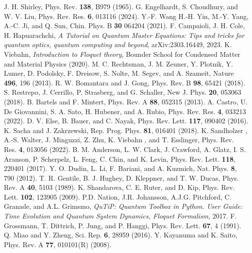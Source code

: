 \documentclass[reprint, amsmath, amssymb, aps]{revtex4-2}
\begin{document}
\begin{thebibliography}{9}
J. H. Shirley, Phys. Rev. \textbf{138}, B979 (1965). 
G. Engelhardt, S. Choudhury, and W. V. Liu, Phys. Rev. Res. \textbf{6}, 013116 (2024). 
Y.-F. Wang H.-H. Yin, M.-Y. Yang, A.-C. Ji, and Q. Sun, Chin. Phys. B \textbf{30} 064204 (2021).
F. Campaioli, J. H. Cole, H. Hapuarachchi, \textit{A Tutorial on Quantum Master Equations: Tips and tricks for quantum optics, quantum computing and beyond}, arXiv:2303.16449, 2023. 
K. Viebahn, \textit{Introduction to Floquet theory}, Bounder School for Condensed Matter and Material Physics (2020).
M. C. Rechtsman, J. M. Zeuner, Y. Plotnik, Y. Lumer, D. Podolsky, F. Dreisow, S. Nolte, M. Segev, and A. Szameit, Nature \textbf{496}, 196 (2013).
R. W. Bomantara and J. Gong, Phys. Rev. B \textbf{98}, 65421 (2018).
S. Restrepo, J. Cerrillo, P. Strasberg, and G. Schaller, New J. Phys. \textbf{20}, 053063 (2018).
B. Bartels and F. Mintert, Phys. Rev. A \textbf{88}, 052315 (2013).
A. Castro, U. De Giovannini, S. A. Sato, H. Hubener, and A. Rubio, Phys. Rev. Res. \textbf{4}, 033213 (2022).
D. V. Else, B. Bauer, and C. Nayak, Phys. Rev. Lett. \textbf{117}, 090402 (2016).
K. Sacha and J. Zakrzewski, Rep. Prog. Phys. \textbf{81}, 016401 (2018).
K. Sandholzer , A.-S. Walter, J. Minguzzi, Z. Zhu, K. Viebahn , and T. Esslinger, Phys. Rev. Res. \textbf{4}, 013056 (2022). 
B. M. Anderson, L. W. Clark, J. Crawford, A. Glatz, I. S. Aranson, P. Scherpelz, L. Feng, C. Chin, and K. Levin, Phys. Rev. Lett. \textbf{118}, 220401 (2017). 
Y. O. Dudin, L. Li, F. Bariani, and A. Kuzmich, Nat. Phys. \textbf{8}, 790 (2012).
T. R. Gentile, B. J. Hughey, D. Kleppner, and T. W. Ducas, Phys. Rev. A \textbf{40}, 5103 (1989). 
K. Shandarova, C. E. Ruter, and D. Kip, Phys. Rev. Lett. \textbf{102}, 123905 (2009).
P.D. Nation, J.R. Johansson, A.J.G. Pitchford, C. Granade, and A.L. Grimsmo, \textit{QuTiP: Quantum Toolbox in Python. User Guide: Time Evolution and Quantum System Dynamics, Floquet Formalism}, 2017. 
F. Grossmann, T. Dittrich, P. Jung, and P. Hanggi, Phys. Rev. Lett. \textbf{67}, 4 (1991).
Q. Miao and Y. Zheng, Sci. Rep. \textbf{6}, 28959 (2016).
Y. Kayanuma and K. Saito, Phys. Rev. A \textbf{77}, 010101(R) (2008).

\end{thebibliography}
\end{document}
